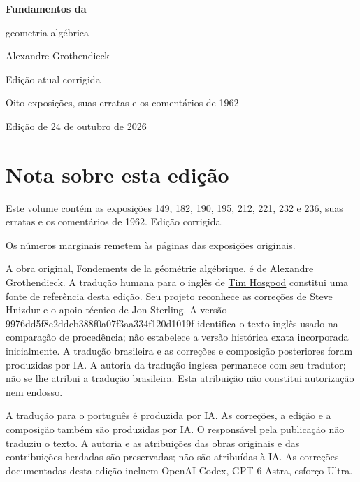 \documentclass[11pt,twoside,openany]{book}
\begin{document}
\frontmatter
\begin{titlepage}
\centering
\vspace*{0.13\textheight}
{\Huge\bfseries Fundamentos da\par geometria algébrica\par}
\vspace{1.5\baselineskip}
{\Large Alexandre Grothendieck\par}
\vfill
{\Large Edição atual corrigida\par}
\vspace{\baselineskip}
{\large Oito exposições, suas erratas e os comentários de 1962\par}
\vspace{1.5\baselineskip}
{\normalsize Edição de 24 de outubro de 2026\par}
\end{titlepage}
\chapter*{Nota sobre esta edição}
Este volume contém as exposições 149, 182, 190, 195, 212, 221, 232 e 236, suas erratas e os comentários de 1962. Edição corrigida.

Os números marginais remetem às páginas das exposições originais.

A obra original, Fondements de la géométrie algébrique, é de Alexandre Grothendieck. A tradução humana para o inglês de \href{https://github.com/thosgood/fga/tree/9976dd5f8e2ddcb388f0a07f3aa334f120d1019f}{Tim Hosgood} constitui uma fonte de referência desta edição. Seu projeto reconhece as correções de Steve Hnizdur e o apoio técnico de Jon Sterling. A versão 9976dd5f8e2ddcb388f0a07f3aa334f120d1019f identifica o texto inglês usado na comparação de procedência; não estabelece a versão histórica exata incorporada inicialmente. A tradução brasileira e as correções e composição posteriores foram produzidas por IA. A autoria da tradução inglesa permanece com seu tradutor; não se lhe atribui a tradução brasileira. Esta atribuição não constitui autorização nem endosso.

A tradução para o português é produzida por IA. As correções, a edição e a composição também são produzidas por IA. O responsável pela publicação não traduziu o texto. A autoria e as atribuições das obras originais e das contribuições herdadas são preservadas; não são atribuídas à IA. As correções documentadas desta edição incluem OpenAI Codex, GPT-6 Astra, esforço Ultra.
\end{document}
